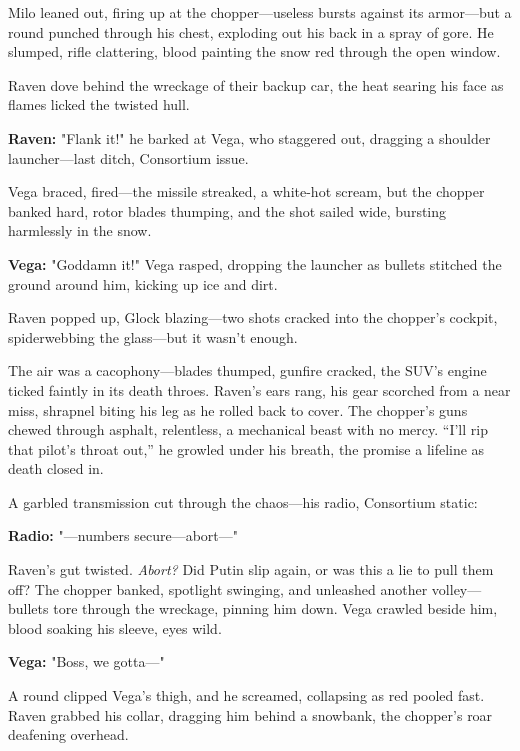 \documentclass[12pt]{book}
\begin{document}
Milo leaned out, firing up at the chopper—useless bursts against its armor—but a round punched through his chest, exploding out his back in a spray of gore. He slumped, rifle clattering, blood painting the snow red through the open window.

Raven dove behind the wreckage of their backup car, the heat searing his face as flames licked the twisted hull.

\vspace{0.5em}
\textbf{Raven:} "Flank it!" he barked at Vega, who staggered out, dragging a shoulder launcher—last ditch, Consortium issue.

Vega braced, fired—the missile streaked, a white-hot scream, but the chopper banked hard, rotor blades thumping, and the shot sailed wide, bursting harmlessly in the snow.

\vspace{0.5em}
\textbf{Vega:} "Goddamn it!" Vega rasped, dropping the launcher as bullets stitched the ground around him, kicking up ice and dirt.

Raven popped up, Glock blazing—two shots cracked into the chopper’s cockpit, spiderwebbing the glass—but it wasn’t enough.

The air was a cacophony—blades thumped, gunfire cracked, the SUV’s engine ticked faintly in its death throes. Raven’s ears rang, his gear scorched from a near miss, shrapnel biting his leg as he rolled back to cover. The chopper’s guns chewed through asphalt, relentless, a mechanical beast with no mercy. “I’ll rip that pilot’s throat out,” he growled under his breath, the promise a lifeline as death closed in.

A garbled transmission cut through the chaos—his radio, Consortium static:

\vspace{0.5em}
\textbf{Radio:} "—numbers secure—abort—"

Raven’s gut twisted. \textit{Abort?} Did Putin slip again, or was this a lie to pull them off? The chopper banked, spotlight swinging, and unleashed another volley—bullets tore through the wreckage, pinning him down. Vega crawled beside him, blood soaking his sleeve, eyes wild.

\vspace{0.5em}
\textbf{Vega:} "Boss, we gotta—"

A round clipped Vega’s thigh, and he screamed, collapsing as red pooled fast. Raven grabbed his collar, dragging him behind a snowbank, the chopper’s roar deafening overhead.
\end{document}
